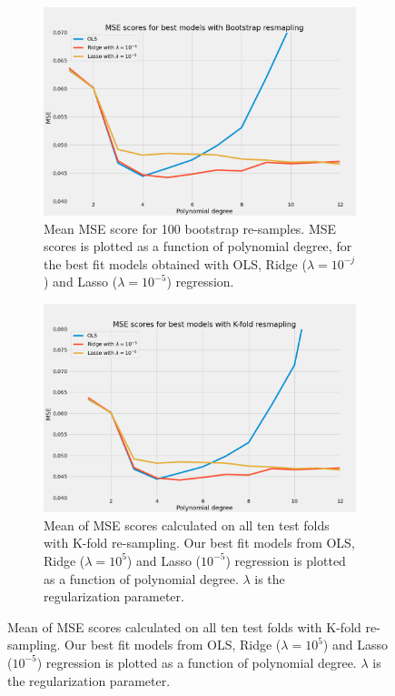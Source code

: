 \begin{figure}[H]
     \centering
     \begin{subfigure}[t]{0.49\textwidth}
         \centering
         \includegraphics[width=\textwidth]{Figures/franke_ols_ridge_lasso_boots.png}
         \caption{Mean MSE score for 100 bootstrap re-samples. MSE scores is
             plotted as a function of polynomial degree, for the best fit
             models obtained with OLS, Ridge ($\lambda =
             10^{-j}$) and Lasso ($\lambda = 10^{-5}$) regression.}  
         \label{} 
     \end{subfigure}
     \hfill
     \begin{subfigure}[t]{0.49\textwidth}
         \centering
         \includegraphics[width=\textwidth]{Figures/franke_ols_ridge_lasso_kfold.png}
         \caption{Mean of MSE scores calculated on all ten test folds with K-fold
             re-sampling. Our best fit models from OLS, Ridge ($\lambda =
             10^{5}$) and Lasso ($10^{-5}$) regression
     is plotted as a function of polynomial degree. $\lambda $ is the 
 regularization parameter.}  
         \label{fig}
     \end{subfigure}

\end{figure}



